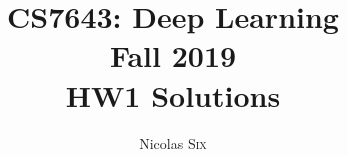 \documentclass[11pt,english]{article}
\begin{document}
\title{CS7643: Deep Learning \\
Fall 2019\\ HW1 Solutions}
\author{Nicolas \textsc{Six}}
\maketitle



    

\pagebreak

    

\pagebreak

    

\pagebreak

    

\pagebreak

    

\pagebreak

    

\pagebreak

    

\pagebreak

    

\pagebreak

    

\pagebreak

    
\end{document}
